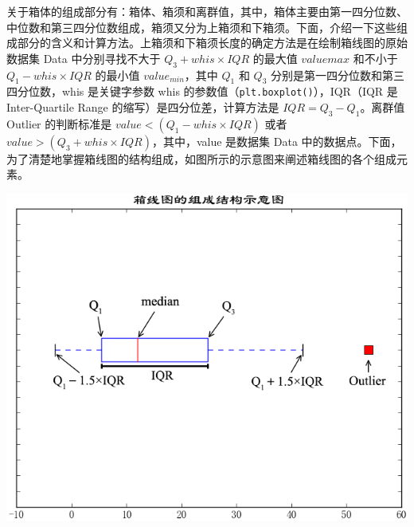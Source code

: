 \documentclass{minimal}
\begin{document}
关于箱体的组成部分有：箱体、箱须和离群值，其中，箱体主要由第一四分位数、中位数和第三四分位数组成，箱须又分为上箱须和下箱须。下面，介绍一下这些组成部分的含义和计算方法。上箱须和下箱须长度的确定方法是在绘制箱线图的原始数据集 Data 中分别寻找不大于 $Q_3+whis\times IQR$ 的最大值 $value{max}$ 和不小于 $Q_1-whis\times IQR$ 的最小值 $value_{min}$，其中 $Q_1$ 和 $Q_3$ 分别是第一四分位数和第三四分位数，whis 是关键字参数 whis 的参数值（\verb|plt.boxplot()|），IQR（IQR 是 Inter-Quartile Range 的缩写）是四分位差，计算方法是 $IQR=Q_3-Q_1$。离群值 Outlier 的判断标准是 $value<(Q_1-whis\times IQR)$ 或者 $value>(Q_3+whis\times IQR)$，其中，value 是数据集 Data 中的数据点。下面，为了清楚地掌握箱线图的结构组成，如图所示的示意图来阐述箱线图的各个组成元素。

\begin{center}
    \includegraphics[width=.7\textwidth]{./fig3-22.png}
\end{center}
\end{document}
